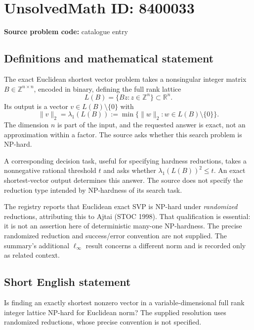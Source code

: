\documentclass[11pt]{article}
\newcommand{\Z}{\mathbb{Z}}
\newcommand{\R}{\mathbb{R}}
\begin{document}
\section*{UnsolvedMath ID: 8400033}
\textbf{Source problem code:} catalogue entry
\subsection{Definitions and mathematical statement}
The exact Euclidean shortest vector problem takes a nonsingular integer matrix \(B\in\Z^{n\times n}\), encoded in binary, defining the full rank lattice
\[
 L(B)=\{Bz:z\in\Z^n\}\subset\R^n.
\]
Its output is a vector \(v\in L(B)\setminus\{0\}\) with
\[
 \|v\|_2=\lambda_1(L(B)):=\min\{\|w\|_2:w\in L(B)\setminus\{0\}\}.
\]
The dimension \(n\) is part of the input, and the requested answer is exact, not an approximation within a factor. The source asks whether this search problem is NP-hard.

A corresponding decision task, useful for specifying hardness reductions, takes a nonnegative rational threshold \(t\) and asks whether \(\lambda_1(L(B))^2\leq t\). An exact shortest-vector output determines this answer. The source does not specify the reduction type intended by NP-hardness of its search task.

The registry reports that Euclidean exact SVP is NP-hard under \emph{randomized} reductions, attributing this to Ajtai (STOC 1998). That qualification is essential: it is not an assertion here of deterministic many-one NP-hardness. The precise randomized reduction and success/error convention are not supplied. The summary's additional \(\ell_\infty\) result concerns a different norm and is recorded only as related context.
\subsection{Short English statement}
Is finding an exactly shortest nonzero vector in a variable-dimensional full rank integer lattice NP-hard for Euclidean norm? The supplied resolution uses randomized reductions, whose precise convention is not specified.
\end{document}
